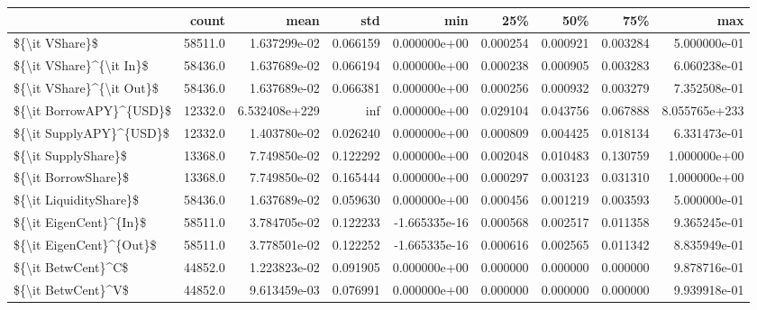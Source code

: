 \begin{tabular}{lrrrrrrrr}
\toprule
{} &    count &           mean &        std &           min &        25\% &        50\% &        75\% &            max \\
\midrule
\$\{\textbackslash it VShare\}\$           &  58511.0 &   1.637299e-02 &   0.066159 &  0.000000e+00 &   0.000254 &   0.000921 &   0.003284 &   5.000000e-01 \\
\$\{\textbackslash it VShare\}\textasciicircum \{\textbackslash it In\}\$  &  58436.0 &   1.637689e-02 &   0.066194 &  0.000000e+00 &   0.000238 &   0.000905 &   0.003283 &   6.060238e-01 \\
\$\{\textbackslash it VShare\}\textasciicircum \{\textbackslash it Out\}\$ &  58436.0 &   1.637689e-02 &   0.066381 &  0.000000e+00 &   0.000256 &   0.000932 &   0.003279 &   7.352508e-01 \\
\$\{\textbackslash it BorrowAPY\}\textasciicircum \{USD\}\$  &  12332.0 &  6.532408e+229 &        inf &  0.000000e+00 &   0.029104 &   0.043756 &   0.067888 &  8.055765e+233 \\
\$\{\textbackslash it SupplyAPY\}\textasciicircum \{USD\}\$  &  12332.0 &   1.403780e-02 &   0.026240 &  0.000000e+00 &   0.000809 &   0.004425 &   0.018134 &   6.331473e-01 \\
\$\{\textbackslash it SupplyShare\}\$      &  13368.0 &   7.749850e-02 &   0.122292 &  0.000000e+00 &   0.002048 &   0.010483 &   0.130759 &   1.000000e+00 \\
\$\{\textbackslash it BorrowShare\}\$      &  13368.0 &   7.749850e-02 &   0.165444 &  0.000000e+00 &   0.000297 &   0.003123 &   0.031310 &   1.000000e+00 \\
\$\{\textbackslash it LiquidityShare\}\$   &  58436.0 &   1.637689e-02 &   0.059630 &  0.000000e+00 &   0.000456 &   0.001219 &   0.003593 &   5.000000e-01 \\
\$\{\textbackslash it EigenCent\}\textasciicircum \{In\}\$   &  58511.0 &   3.784705e-02 &   0.122233 & -1.665335e-16 &   0.000568 &   0.002517 &   0.011358 &   9.365245e-01 \\
\$\{\textbackslash it EigenCent\}\textasciicircum \{Out\}\$  &  58511.0 &   3.778501e-02 &   0.122252 & -1.665335e-16 &   0.000616 &   0.002565 &   0.011342 &   8.835949e-01 \\
\$\{\textbackslash it BetwCent\}\textasciicircum C\$       &  44852.0 &   1.223823e-02 &   0.091905 &  0.000000e+00 &   0.000000 &   0.000000 &   0.000000 &   9.878716e-01 \\
\$\{\textbackslash it BetwCent\}\textasciicircum V\$       &  44852.0 &   9.613459e-03 &   0.076991 &  0.000000e+00 &   0.000000 &   0.000000 &   0.000000 &   9.939918e-01 \\

\end{tabular}
